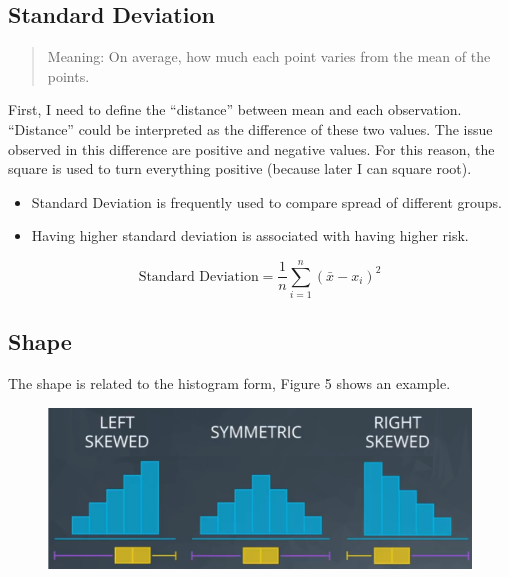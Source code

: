 \documentclass[]{book}
\providecommand{\tightlist}{%
  \setlength{\itemsep}{0pt}\setlength{\parskip}{0pt}}
\begin{document}
\subsection{Standard Deviation}\label{standard-deviation}

\begin{quote}
Meaning: On average, how much each point varies from the mean of the
points.
\end{quote}

First, I need to define the ``distance'' between mean and each
observation. ``Distance'' could be interpreted as the difference of
these two values. The issue observed in this difference are positive and
negative values. For this reason, the square is used to turn everything
positive (because later I can square root).

\begin{itemize}
\tightlist
\item
  Standard Deviation is frequently used to compare spread of different
  groups.
\item
  Having higher standard deviation is associated with having higher
  risk.
\end{itemize}

\[ \text{Standard Deviation} = \frac{1}{n} \sum_{i = 1}^n (\bar x - x_i)^2 \tag{3}\]

\subsection{Shape}\label{shape}

The shape is related to the histogram form, Figure 5 shows an example.

\begin{figure}
\centering
\includegraphics{01-img/c4_l2_05.png}
\caption{}
\end{figure}
\end{document}
